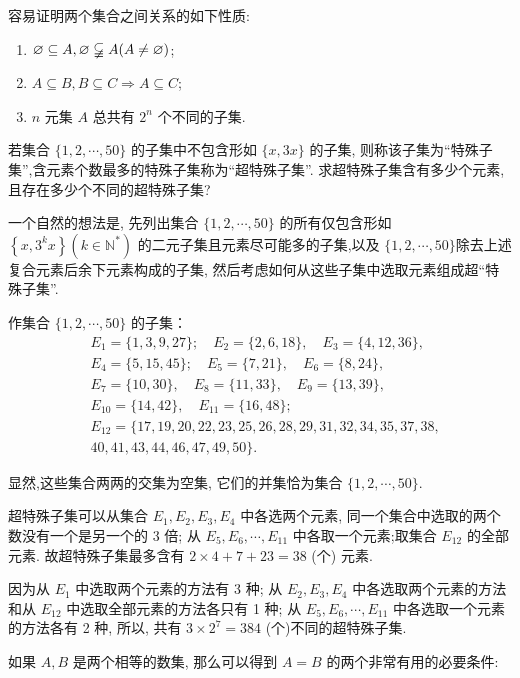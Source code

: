 容易证明两个集合之间关系的如下性质:
\begin{enumerate}
	\item $\varnothing \subseteq A, \varnothing \varsubsetneqq A(A \neq \varnothing)$;
	\item $A \subseteq B, B \subseteq C \Rightarrow A \subseteq C$;
	\item $n$ 元集 $A$ 总共有 $2^{n}$ 个不同的子集.
\end{enumerate}
\begin{example}
	若集合 $\{1,2, \cdots, 50\}$ 的子集中不包含形如 $\{x, 3 x\}$ 的子集, 则称该子集为“特殊子集”,含元素个数最多的特殊子集称为“超特殊子集”. 求超特殊子集含有多少个元素,且存在多少个不同的超特殊子集?
\end{example}

\begin{analysis}
	一个自然的想法是, 先列出集合 $\{1,2, \cdots, 50\}$ 的所有仅包含形如 $\left\{x, 3^{k} x\right\}\left(k \in \mathbb{N}^{*}\right)$ 的二元子集且元素尽可能多的子集,以及 $\{1,2, \cdots, 50\}$除去上述复合元素后余下元素构成的子集, 然后考虑如何从这些子集中选取元素组成超“特殊子集”.
\end{analysis}
\begin{solution}
	作集合 $\{1,2, \cdots, 50\}$ 的子集：
	$$
		\begin{aligned}
			 & E_{1}=\{1,3,9,27\} ; \quad E_{2}=\{2,6,18\}, \quad E_{3}=\{4,12,36\}, \\
			 & E_{4}=\{5,15,45\} ; \quad E_{5}=\{7,21\}, \quad E_{6}=\{8,24\},       \\
			 & E_{7}=\{10,30\}, \quad E_{8}=\{11,33\}, \quad E_{9}=\{13,39\},        \\
			 & E_{10}=\{14,42\}, \quad E_{11}=\{16,48\} ;                            \\
			 & E_{12}=\{17,19,20,22,23,25,26,28,29,31,32,34,35,37,38,                \\
			 & 40,41,43,44,46,47,49,50\} .
		\end{aligned}
	$$

	显然,这些集合两两的交集为空集, 它们的并集恰为集合 $\{1,2, \cdots, 50\}$.

	超特殊子集可以从集合 $E_{1} ,  E_{2} ,  E_{3} ,  E_{4}$ 中各选两个元素, 同一个集合中选取的两个数没有一个是另一个的 3 倍; 从 $E_{5}, E_{6}, \cdots, E_{11}$ 中各取一个元素;取集合 $E_{12}$ 的全部元素. 故超特殊子集最多含有 $2 \times 4+7+23=38$ (个) 元素.

	因为从 $E_{1}$ 中选取两个元素的方法有 3 种; 从 $E_{2} ,  E_{3} ,  E_{4}$ 中各选取两个元素的方法和从 $E_{12}$ 中选取全部元素的方法各只有 1 种; 从 $E_{5}, E_{6}, \cdots, E_{11}$ 中各选取一个元素的方法各有 2 种, 所以, 共有 $3 \times 2^{7}=384$ (个)不同的超特殊子集.
\end{solution}
如果 $A ,  B$ 是两个相等的数集, 那么可以得到 $A=B$ 的两个非常有用的必要条件:

